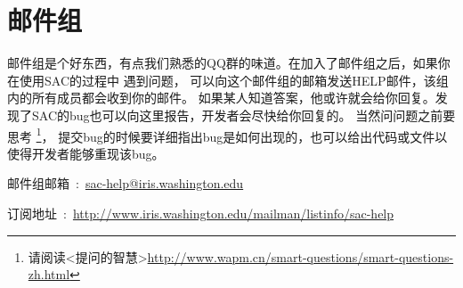 \section{邮件组}
邮件组是个好东西，有点我们熟悉的QQ群的味道。在加入了邮件组之后，如果你在使用SAC的过程中
遇到问题，
可以向这个邮件组的邮箱发送HELP邮件，该组内的所有成员都会收到你的邮件。
如果某人知道答案，他或许就会给你回复。发现了SAC的bug也可以向这里报告，开发者会尽快给你回复的。
当然问问题之前要思考
\footnote{请阅读<提问的智慧>\url{http://www.wapm.cn/smart-questions/smart-questions-zh.html}}，
提交bug的时候要详细指出bug是如何出现的，也可以给出代码或文件以使得开发者能够重现该bug。

邮件组邮箱~:~\url{sac-help@iris.washington.edu}

订阅地址~:~\small{\url{http://www.iris.washington.edu/mailman/listinfo/sac-help}}
